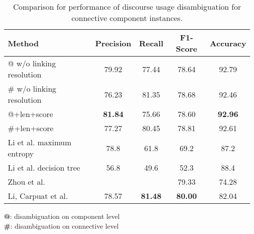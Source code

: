 \begin{table}[ht]
\centering
\begin{tabular}{|l|c|c|c|c|}
\hline

    Method                    &     Precision &     Recall &     F1-Score &     Accuracy \\ \hline
    @ w/o linking resolution  &     79.92     &     77.44  &     78.64    &     92.79    \\ \hline
    \# w/o linking resolution &     76.23     &     81.35  &     78.68    &     92.46    \\ \hline
    @+len+score               & \bf 81.84     &     75.66  &     78.60    & \bf 92.96    \\ \hline
    \#+len+score              &     77.27     &     80.45  &     78.81    &     92.61    \\

\hhline{|=|=|=|=|=|}

    Li et al. maximum entropy &     78.8      &     61.8   &     69.2     &     87.2     \\ \hline
    Li et al. decision tree   &     56.8      &     49.6   &     52.3     &     88.4     \\

\hhline{|=|=|=|=|=|}

    Zhou et al.               &               &            &     79.33    &     74.28    \\ \hline
    Li, Carpuat et al.        &     78.57     & \bf 81.48  & \bf 80.00    &     82.04    \\ \hline

\end{tabular}
\begin{flushleft}
\small
\textbf{@}: disambiguation on component level \\
\textbf{\#}: disambiguation on connective level \\
\end{flushleft}
\caption{\label{t:recognition-methods} Comparison for performance of discourse usage
disambiguation for connective component instances. }
\end{table}

